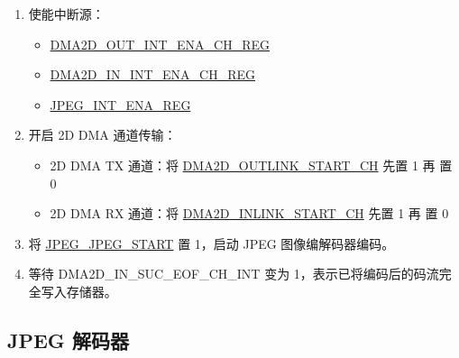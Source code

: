 \documentclass[main\_\_CN.tex]{subfiles}
\begin{document}
\begin{enumerate}
\begin{enumerate}
\begin{itemize}
            \item 2D DMA TX 通道：\hyperref[fielddesc:DMA2DOUTLINKADDRCHN]{DMA2D\_OUTLINK\_ADDR\_CH}
            \item 2D DMA RX 通道：\hyperref[fielddesc:DMA2DINLINKADDRCHN]{DMA2D\_INLINK\_ADDR\_CH}
        \end{itemize}
    \end{enumerate}
    \item 使能中断源：
    \begin{itemize}
        \item \hyperref[regdesc:DMA2DOUTINTENACHNREG]{DMA2D\_OUT\_INT\_ENA\_CH\_REG}
        \item \hyperref[regdesc:DMA2DININTENACHNREG]{DMA2D\_IN\_INT\_ENA\_CH\_REG}
        \item \hyperref[regdesc:JPEGINTENAREG]{JPEG\_INT\_ENA\_REG}
    \end{itemize}
    \item 开启 2D DMA 通道传输：
    \begin{itemize}
        \item 2D DMA TX 通道：将 \hyperref[fielddesc:DMA2DOUTLINKSTARTCHN]{DMA2D\_OUTLINK\_START\_CH} 先置 1 再 置 0
        \item 2D DMA RX 通道：将 \hyperref[fielddesc:DMA2DINLINKSTARTCHN]{DMA2D\_INLINK\_START\_CH} 先置 1 再 置 0
    \end{itemize}
    \item 将 \hyperref[fielddesc:JPEGJPEGSTART]{JPEG\_JPEG\_START} 置 1，启动 JPEG 图像编解码器编码。
    \item 等待 DMA2D\_IN\_SUC\_EOF\_CH\_INT 变为 1，表示已将编码后的码流完全写入存储器。
\end{enumerate}


\subsection{JPEG 解码器}
\label{sec:jpegcodec-dec-prog}
\end{document}
